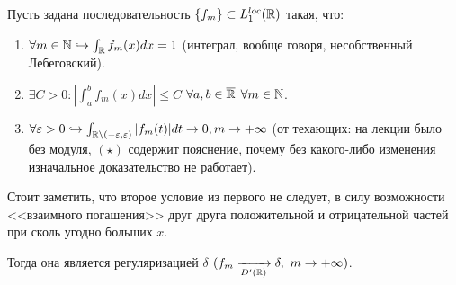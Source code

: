 \begin{theorem}
    Пусть задана последовательность $\{f_m\} \subset L_1^{loc}(\mathbb{R})$ такая, что:
    \begin{enumerate}
        \item $\forall m \in \mathbb{N} \hookrightarrow \int_{\mathbb{R}} f_m(x) dx = 1$ (интеграл, вообще говоря, несобственный Лебеговский).
        
        \item $\exists C > 0 : |\int_a^b f_m(x)dx| \leq C$ $\forall a, b \in \overline{\mathbb{R}}$ $\forall m \in \mathbb{N}$.
        
        \item $\forall \varepsilon > 0 \hookrightarrow \int_{\mathbb{R} \setminus (-\varepsilon, \varepsilon)} |f_m(t)|dt \rightarrow 0, m \rightarrow +\infty$ (от техающих: на лекции было без модуля, $(\star)$ содержит пояснение, почему без какого-либо изменения изначальное доказательство не работает).
    \end{enumerate}
    \begin{note}
        Стоит заметить, что второе условие из первого не следует, в силу возможности <<взаимного погашения>> друг друга положительной и отрицательной частей при сколь угодно больших $x$.
    \end{note}
    Тогда она является регуляризацией $\delta$ $(f_m \xrightarrow[D'(\mathbb{R})]{} \delta, \ m \rightarrow +\infty)$.
\end{theorem}
